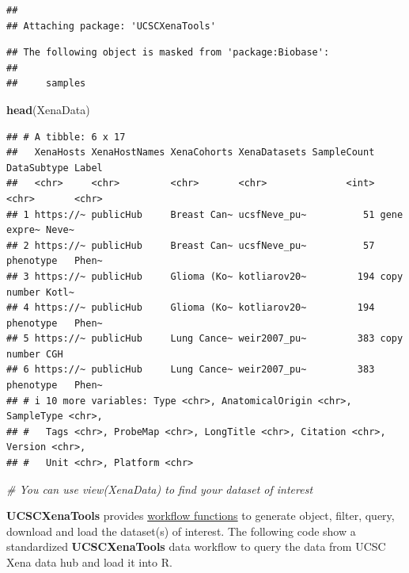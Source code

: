 \documentclass[
  12pt,
]{book}
\newenvironment{Shaded}{\begin{snugshade}}{\end{snugshade}}
\newcommand{\CommentTok}[1]{\textcolor[rgb]{0.56,0.35,0.01}{\textit{#1}}}
\newcommand{\FunctionTok}[1]{\textcolor[rgb]{0.13,0.29,0.53}{\textbf{#1}}}
\newcommand{\NormalTok}[1]{#1}
\begin{document}
\begin{verbatim}
## 
## Attaching package: 'UCSCXenaTools'
\end{verbatim}

\begin{verbatim}
## The following object is masked from 'package:Biobase':
## 
##     samples
\end{verbatim}

\begin{Shaded}
\begin{Highlighting}[]
\FunctionTok{head}\NormalTok{(XenaData)}
\end{Highlighting}
\end{Shaded}

\begin{verbatim}
## # A tibble: 6 x 17
##   XenaHosts XenaHostNames XenaCohorts XenaDatasets SampleCount DataSubtype Label
##   <chr>     <chr>         <chr>       <chr>              <int> <chr>       <chr>
## 1 https://~ publicHub     Breast Can~ ucsfNeve_pu~          51 gene expre~ Neve~
## 2 https://~ publicHub     Breast Can~ ucsfNeve_pu~          57 phenotype   Phen~
## 3 https://~ publicHub     Glioma (Ko~ kotliarov20~         194 copy number Kotl~
## 4 https://~ publicHub     Glioma (Ko~ kotliarov20~         194 phenotype   Phen~
## 5 https://~ publicHub     Lung Cance~ weir2007_pu~         383 copy number CGH  
## 6 https://~ publicHub     Lung Cance~ weir2007_pu~         383 phenotype   Phen~
## # i 10 more variables: Type <chr>, AnatomicalOrigin <chr>, SampleType <chr>,
## #   Tags <chr>, ProbeMap <chr>, LongTitle <chr>, Citation <chr>, Version <chr>,
## #   Unit <chr>, Platform <chr>
\end{verbatim}

\begin{Shaded}
\begin{Highlighting}[]
\CommentTok{\# You can use view(XenaData) to find your dataset of interest}
\end{Highlighting}
\end{Shaded}

\textbf{UCSCXenaTools} provides \href{https://cran.r-project.org/web/packages/UCSCXenaTools/vignettes/USCSXenaTools.html\#workflow}{workflow functions} to generate object, filter, query, download and load the dataset(s) of interest. The following code show a standardized \textbf{UCSCXenaTools} data workflow to query the data from UCSC Xena data hub and load it into R.
\end{document}

